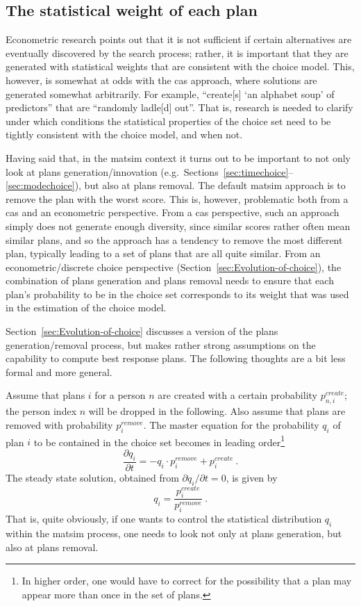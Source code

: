 \subsection{The statistical weight of each plan}

Econometric research \citep[e.g.][Chapter 8 and 9]{BenAkivaLerman_1985} points out that it is not sufficient if certain alternatives are eventually discovered by the search process; rather, it is important that they are generated with statistical weights that are consistent with the choice model.
%
This, however, is somewhat at odds with the \acrfull{cas} approach, where solutions are generated somewhat arbitrarily.  For example, \citet{ArthurBar} ``create[s] `an alphabet soup' of predictors'' that are ``randomly ladle[d] out''.  That is, research is needed to clarify under which conditions the statistical properties of the choice set need to be tightly consistent with the choice model, and when not.

Having said that, in the \gls{matsim} context it turns out to be important to not only look at plans generation/innovation (e.g.\ Sections~\ref{sec:timechoice}--\ref{sec:modechoice}), but also at plans removal.  The default \gls{matsim} approach is to remove the plan with the worst score.  This is, however, problematic both from a \gls{cas} and an econometric perspective.  
%
From a \gls{cas} perspective, such an approach simply does not generate enough diversity, since similar scores rather often mean similar plans, and so the approach has a tendency to remove the most different plan, typically leading to a set of plans that are all quite similar.
%
From an econometric/discrete choice perspective (\cf Section~\ref{sec:Evolution-of-choice}), the combination of plans generation and plans removal needs to ensure that each plan's probability to be in the choice set corresponds to its weight that was used in the estimation of the choice model.

Section~\ref{sec:Evolution-of-choice} discusses a version of the plans generation/removal process, but makes rather strong assumptions on the capability to compute best response plans.  The following thoughts are a bit less formal and more general.

Assume that plans $i$ for a person $n$ are created with a certain probability $p^{create}_{n,i}$; the person index $n$ will be dropped in the following.  Also assume that plans are removed with probability $p^{remove}_{i}$.  The master equation for the probability $q_{i}$ of plan $i$ to be contained in the choice set becomes in leading order\footnote{%
%
In higher order, one would have to correct for the possibility that a plan may appear more than once in the set of plans.
%
}
\[
\frac{\partial q_{i}}{\partial t}
%
= - q_{i} \cdot p^{remove}_{i} + p^{create}_{i} \ .
\]
The steady state solution, obtained from $\partial q_{i}/\partial t = 0$, is given by
\begin{equation}
q_{i} = \frac{p^{create}_{i}}{p^{remove}_{i}} \ .
\label{eq:5}
\end{equation}
That is, quite obviously, if one wants to control the statistical distribution $q_{i}$ within the \gls{matsim} process, one needs to look not only at plans generation, but also at plans removal.

